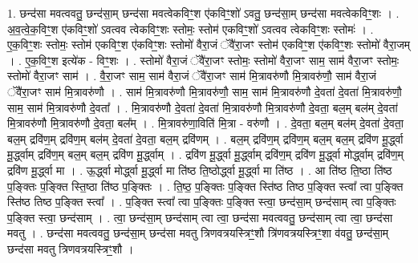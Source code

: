 \documentclass[17pt]{extarticle}
\begin{document}
1. छन्द॑सा मवत्ववतु॒ छन्द॑सा॒म् छन्द॑सा मवत्वेकविꣳ॒॒श ए॑कविꣳ॒॒शो॑ ऽवतु॒ छन्द॑सा॒म् छन्द॑सा मवत्वेकविꣳ॒॒शः । . अ॒व॒त्वे॒क॒विꣳ॒॒श ए॑कविꣳ॒॒शो॑ ऽवत्वव त्वेकविꣳ॒॒शः स्तोमः॒ स्तोम॑ एकविꣳ॒॒शो॑ ऽवत्वव त्वेकविꣳ॒॒शः स्तोमः॑ । . ए॒क॒विꣳ॒॒शः स्तोमः॒ स्तोम॑ एकविꣳ॒॒श ए॑कविꣳ॒॒शः स्तोमो॑ वैरा॒जं ॅवै॑रा॒जꣳ स्तोम॑ एकविꣳ॒॒श ए॑कविꣳ॒॒शः स्तोमो॑ वैरा॒जम् । . ए॒क॒विꣳ॒॒श इत्ये॑क - विꣳ॒॒शः । . स्तोमो॑ वैरा॒जं ॅवै॑रा॒जꣳ स्तोमः॒ स्तोमो॑ वैरा॒जꣳ साम॒ साम॑ वैरा॒जꣳ स्तोमः॒ स्तोमो॑ वैरा॒जꣳ साम॑ । . वै॒रा॒जꣳ साम॒ साम॑ वैरा॒जं ॅवै॑रा॒जꣳ साम॑ मि॒त्रावरु॑णौ मि॒त्रावरु॑णौ॒ साम॑ वैरा॒जं ॅवै॑रा॒जꣳ साम॑ मि॒त्रावरु॑णौ । . साम॑ मि॒त्रावरु॑णौ मि॒त्रावरु॑णौ॒ साम॒ साम॑ मि॒त्रावरु॑णौ दे॒वता॑ दे॒वता॑ मि॒त्रावरु॑णौ॒ साम॒ साम॑ मि॒त्रावरु॑णौ दे॒वता᳚ । . मि॒त्रावरु॑णौ दे॒वता॑ दे॒वता॑ मि॒त्रावरु॑णौ मि॒त्रावरु॑णौ दे॒वता॒ बल॒म् बल॑म् दे॒वता॑ मि॒त्रावरु॑णौ मि॒त्रावरु॑णौ दे॒वता॒ बल᳚म् । . मि॒त्रावरु॑णा॒विति॑ मि॒त्रा - वरु॑णौ । . दे॒वता॒ बल॒म् बल॑म् दे॒वता॑ दे॒वता॒ बल॒म् द्रवि॑ण॒म् द्रवि॑ण॒म् बल॑म् दे॒वता॑ दे॒वता॒ बल॒म् द्रवि॑णम् । . बल॒म् द्रवि॑ण॒म् द्रवि॑ण॒म् बल॒म् बल॒म् द्रवि॑ण मू॒र्द्ध्वा मू॒र्द्ध्वाम् द्रवि॑ण॒म् बल॒म् बल॒म् द्रवि॑ण मू॒र्द्ध्वाम् । . द्रवि॑ण मू॒र्द्ध्वा मू॒र्द्ध्वाम् द्रवि॑ण॒म् द्रवि॑ण मू॒र्द्ध्वा मोर्द्ध्वाम् द्रवि॑ण॒म् द्रवि॑ण मू॒र्द्ध्वा मा । . ऊ॒र्द्ध्वा मोर्द्ध्वा मू॒र्द्ध्वा मा ति॑ष्ठ ति॒ष्ठोर्द्ध्वा मू॒र्द्ध्वा मा ति॑ष्ठ । . आ ति॑ष्ठ ति॒ष्ठा ति॑ष्ठ प॒ङ्क्तिः प॒ङ्क्ति स्ति॒ष्ठा ति॑ष्ठ प॒ङ्क्तिः । . ति॒ष्ठ॒ प॒ङ्क्तिः प॒ङ्क्ति स्ति॑ष्ठ तिष्ठ प॒ङ्क्ति स्त्वा᳚ त्वा प॒ङ्क्ति स्ति॑ष्ठ तिष्ठ प॒ङ्क्ति स्त्वा᳚ । . प॒ङ्क्ति स्त्वा᳚ त्वा प॒ङ्क्तिः प॒ङ्क्ति स्त्वा॒ छन्द॑सा॒म् छन्द॑साम् त्वा प॒ङ्क्तिः प॒ङ्क्ति स्त्वा॒ छन्द॑साम् । . त्वा॒ छन्द॑सा॒म् छन्द॑साम् त्वा त्वा॒ छन्द॑सा मवत्ववतु॒ छन्द॑साम् त्वा त्वा॒ छन्द॑सा मवतु । . छन्द॑सा मवत्ववतु॒ छन्द॑सा॒म् छन्द॑सा मवतु त्रिणवत्रयस्त्रिꣳ॒॒शौ त्रि॑णवत्रयस्त्रिꣳ॒॒शा व॑वतु॒ छन्द॑सा॒म् छन्द॑सा मवतु त्रिणवत्रयस्त्रिꣳ॒॒शौ । \newline
\end{document}
